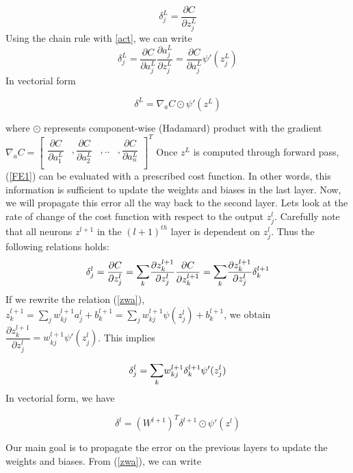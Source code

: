 \documentclass[12pt]{article}
\begin{document}
\begin{equation}
\delta_{j}^{L} = \dfrac{\partial C}{\partial z_{j}^{L}} 
\end{equation}
Using the chain rule with \ref{act}, we can write
\begin{equation}
\label{fe1}
  \delta_{j}^{L} = \dfrac{\partial C}{\partial a_{j}^{L}} \dfrac{\partial a_{j}^{L}}{\partial z_{j}^{L}} = \dfrac{\partial C}{\partial a_{j}^{L}} \psi'(z_{j}^{L})
\end{equation}  
In vectorial form 
\begin{tcolorbox}
\begin{equation}
\label{FE1}
\delta^{L} = \nabla_{a} C \odot  \psi'(z^{L})
\end{equation}
\end{tcolorbox}
where $\odot$ represents component-wise (Hadamard) product with the gradient \\
$\nabla_{a}C =
\begin{bmatrix} 
\dfrac{\partial C}{\partial a_{1}^{L}} &, \dfrac{\partial C}{\partial a_{2}^{L}} &,.. &, \dfrac{\partial C}{\partial a_{n}^{L}} \\
\end{bmatrix}
^{T} 
$
Once $z^{L}$ is computed through forward pass, (\ref{FE1}) can be evaluated with a prescribed cost function. In other words, this information is sufficient to update the weights and biases in the last layer. Now, we will propagate this error all the way back to the second layer. Lets look at the rate of change of the cost function with respect to the output $z_{j}^{l}$. Carefully note that all neurons $z^{l+1}$ in the $(l+1)^{th}$ layer is dependent on $z_{j}^{l}$. Thus the following relations holds:
$$
\delta_{j}^{l} = \dfrac{\partial C}{\partial z_{j}^{l}} =  \mathlarger{\sum}_{k} \dfrac{\partial z_{k}^{l+1}}{\partial z_{j}^{l}} \dfrac{\partial C}{\partial z_{k}^{l+1}} = \mathlarger{\sum}_{k} \dfrac{\partial z_{k}^{l+1}}{\partial z_{j}^{l}}\delta_{k}^{l+1}
$$  
If we rewrite the relation (\ref{zwa}), $z_{k}^{l+1} = \displaystyle{\sum_{j} w_{kj}^{l+1}a_{j}^{l}+b_{k}^{l+1} = \sum_{j} w_{kj}^{l+1}\psi(z_{j}^{l})+b_{k}^{l+1}} $, we obtain $\dfrac{\partial z_{k}^{l+1}}{\partial z_{j}^{l}} = 
w_{kj}^{l+1}\psi'(z_{j}^{l})$. This implies 

\begin{equation}
\delta_{j}^{l} = \mathlarger{\sum}_{k} w_{kj}^{l+1}\delta_{k}^{l+1}\psi'(z_{j}^{l})
\end{equation}
In vectorial form, we have 
\begin{tcolorbox}
\begin{equation}
\label{FE2}
\delta^{l} =  (W^{l+1})^{T}\delta^{l+1} \odot \psi'(z^{l})
\end{equation}
\end{tcolorbox}
Our main goal is to propagate the error on the previous layers to update the weights and biases. From (\ref{zwa}), we can write
\end{document}

